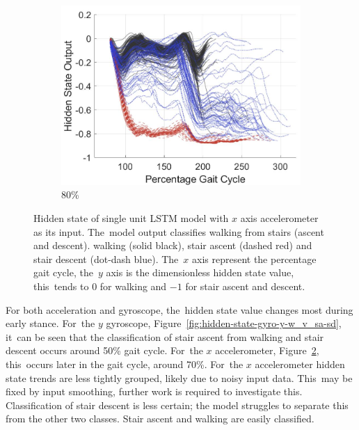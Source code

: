 \begin{figure}[!hbt]
     \begin{subfigure}[H]{0.28\textwidth}
         \centering
         \includegraphics[width=\textwidth]{content/4-LSTM_Behaviour/results/hidden_state/accel_x_w_v_sa-sd/80_Participant_04.jpg}
         \caption{80\%}
         \label{subfig:e}
     \end{subfigure}
\vspace{3pt}
    \caption{Hidden state of single unit LSTM model with $x$ axis accelerometer as its input. The~model output classifies walking from stairs (ascent and descent). walking (solid black), stair ascent (dashed red) and stair descent (dot-dash blue). The~$x$ axis represent the percentage gait cycle, the~$y$ axis is the dimensionless hidden state value, this~tends to $0$ for walking and $-1$ for stair ascent and descent.}
    \label{fig:hidden-state-accel-x-w_v_sa-sd}
\end{figure}


For both acceleration and gyroscope, the~hidden state value changes most during early stance. For~the $y$ gyroscope, Figure~\ref{fig:hidden-state-gyro-y-w_v_sa-sd}, it~can be seen that the classification of stair ascent from walking and stair descent occurs around 50\% gait cycle. For~the $x$ accelerometer, Figure~\ref{fig:hidden-state-accel-x-w_v_sa-sd}, this~occurs later in the gait cycle, around 70\%. For~the $x$ accelerometer hidden state trends are less tightly grouped, likely due to noisy input data. This~may be fixed by input smoothing, further work is required to investigate this. Classification of stair descent is less certain; the model struggles to separate this from the other two classes. Stair ascent and walking are easily classified.

